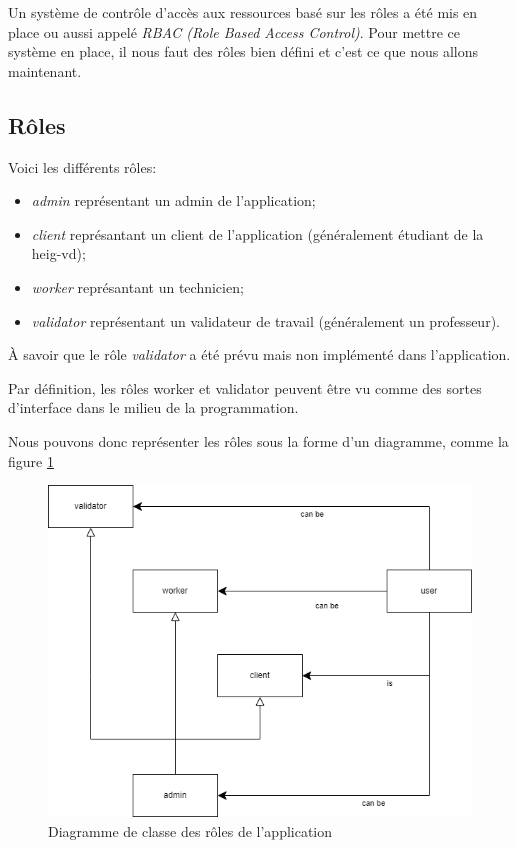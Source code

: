 \documentclass[
    iai, %
    il, %
]{heig-tb}
\begin{document}
Un système de contrôle d'accès aux ressources basé sur les rôles a été mis en place ou aussi appelé \emph{RBAC (Role Based Access Control)}.
Pour mettre ce système en place, il nous faut des rôles bien défini et c'est ce que nous allons maintenant.

\subsection{Rôles}
Voici les différents rôles:
\begin{itemize}
    \item \emph{admin} représentant un admin de l'application;
    \item \emph{client} représantant un client de l'application (généralement étudiant de la \Gls{heig-vd});
    \item \emph{worker} représantant un technicien;
    \item \emph{validator} représentant un validateur de travail (généralement un professeur).
\end{itemize}

À savoir que le rôle \emph{validator} a été prévu mais non implémenté dans l'application.

Par définition, les rôles worker et validator peuvent être vu comme des sortes d'interface dans le milieu de la programmation.

Nous pouvons donc représenter les rôles sous la forme d'un diagramme, comme la figure \ref{roles-diagram.drawio}

\begin{center}
    \begin{figure}[H]
        \includegraphics[width=\textwidth]{./assets/figures/roles-diagram.drawio.png}
        \caption{Diagramme de classe des rôles de l'application \label{roles-diagram.drawio}}
    \end{figure}
\end{center}
\end{document}
